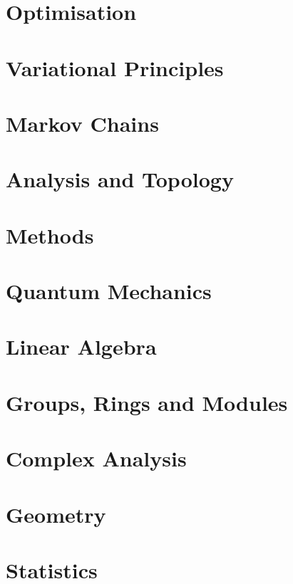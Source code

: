 \newcommand{\yearnumber}{IB}


\chapter{Optimisation}

\chapter{Variational Principles}

\chapter{Markov Chains}

\chapter{Analysis and Topology}

\chapter{Methods}

\chapter{Quantum Mechanics}

\chapter{Linear Algebra}

\chapter{Groups, Rings and Modules}

\chapter{Complex Analysis}

\chapter{Geometry}

\chapter{Statistics}



